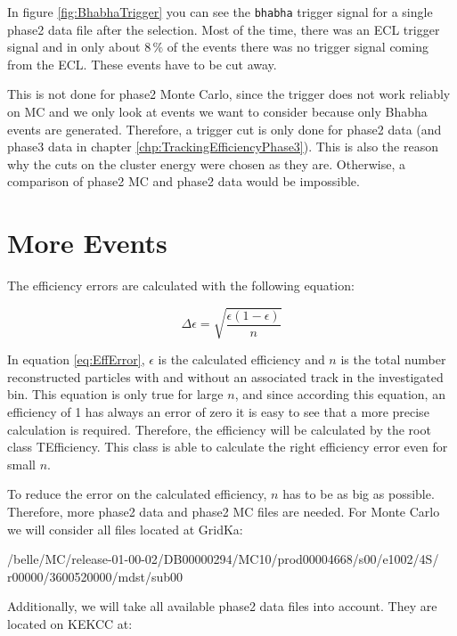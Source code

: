 \documentclass[a4paper,11pt,twosided,final,german,openbib,pdftex,listof=totoc,bibliography=totoc]{scrbook}
\begin{document}
In figure \ref{fig:BhabhaTrigger} you can see the \texttt{bhabha} trigger signal for a single phase2 data file after the selection. Most of the time, there was an ECL trigger signal and in only about $8\,\%$ of the events there was no trigger signal coming from the ECL. These events have to be cut away.

This is not done for phase2 Monte Carlo, since the trigger does not work reliably on MC and we only look at events we want to consider because only Bhabha events are generated. Therefore, a trigger cut is only done for phase2 data (and phase3 data in chapter \ref{chp:TrackingEfficiencyPhase3}). This is also the reason why the cuts on the cluster energy were chosen as they are. Otherwise, a comparison of phase2 MC and phase2 data would be impossible.

\section{More Events}
\label{sec:Phase2MoreEvents}


The efficiency errors are calculated with the following equation:

\begin{equation}
\Delta \epsilon = \sqrt{\frac{\epsilon(1-\epsilon)}{n}}
\label{eq:EffError}
\end{equation}

In equation \ref{eq:EffError}, $\epsilon$ is the calculated efficiency and $n$ is the total number reconstructed particles with and without an associated track in the investigated bin. This equation is only true for large $n$, and since according this equation, an efficiency of 1 has always an error of zero it is easy to see that a more precise calculation is required. Therefore, the efficiency will be calculated by the root class TEfficiency. This class is able to calculate the right efficiency error even for small $n$. \cite{TEfficiency}



To reduce the error on the calculated efficiency, $n$ has to be as big as possible. Therefore, more phase2 data and phase2 MC files are needed. For Monte Carlo we will consider all files located at GridKa: 
\newline

/belle/MC/release-01-00-02/DB00000294/MC10/prod00004668/s00/e1002/4S/
r00000/3600520000/mdst/sub00
\newline

Additionally, we will take all available phase2 data files into account. They are located on KEKCC at:
\newline
\end{document}
